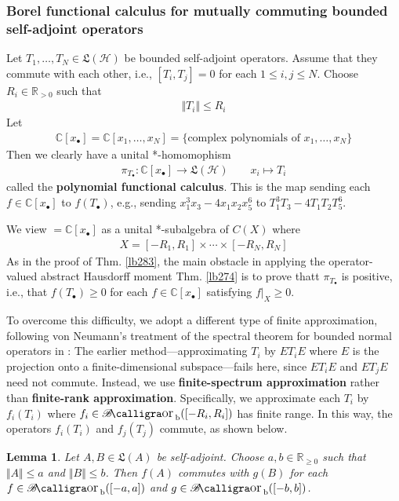 \documentclass[12pt,b5paper,notitlepage]{article}
\theoremstyle{definition}
\theoremstyle{plain}
\newtheorem{lm}[df]{Lemma}
\DeclareMathOperator{\Borb}{{\mathscr{B}\text{\kern -2pt {\calligra\large or}}\,}_{\mathrm b}}
\newcommand{\fk}{\mathfrak}
\newcommand{\blt}{\bullet}
\newcommand{\Cbb}{\mathbb C}
\newcommand{\Rbb}{\mathbb R}
\newcommand{\MH}{\mathcal H}
\numberwithin{equation}{section}
\begin{document}
\subsubsection{Borel functional calculus for mutually commuting bounded self-adjoint operators}


Let $T_1,\dots,T_N\in\fk L(\MH)$ be bounded self-adjoint operators. Assume that they commute with each other, i.e., $[T_i,T_j]=0$ for each $1\leq i,j\leq N$. Choose $R_i\in\Rbb_{>0}$ such that
\begin{align*}
\Vert T_i\Vert\leq R_i
\end{align*}
Let
\begin{align*}
\Cbb[x_\blt]=\Cbb[x_1,\dots,x_N]=\{\text{complex polynomials of }x_1,\dots,x_N\}
\end{align*}
Then we clearly have a unital *-homomophism
\begin{align*}
\pi_{T_\blt}:\Cbb[x_\blt]\rightarrow\fk L(\MH)\qquad x_i\mapsto T_i
\end{align*}
called the \textbf{polynomial functional calculus}.  This is the map sending each $f\in\Cbb[x_\blt]$ to $f(T_\blt)$, e.g., sending $x_1^3x_3-4x_1x_2x_5^6$ to $T_1^3T_3-4T_1T_2T_5^6$.

We view $=\Cbb[x_\blt]$ as a unital *-subalgebra of $C(X)$ where
\begin{align*}
X=[-R_1,R_1]\times\cdots\times[-R_N,R_N]
\end{align*}
As in the proof of Thm. \ref{lb283}, the main obstacle in applying the operator-valued abstract Hausdorff moment Thm. \ref{lb274} is to prove thatt $\pi_{T_\blt}$ is positive, i.e., that $f(T_\blt)\geq0$ for each $f\in\Cbb[x_\blt]$ satisfying $f|_X\geq0$. 


To overcome this difficulty, we adopt a different type of finite approximation, following von Neumann’s treatment of the spectral theorem for bounded normal operators in \cite[Anhang 2]{vN29a}: The earlier method---approximating $T_i$ by $ET_iE$ where $E$ is the projection onto a finite-dimensional subspace---fails here, since $ET_iE$ and $ET_jE$ need not commute. Instead, we use \textbf{finite-spectrum approximation} rather than \textbf{finite-rank approximation}. Specifically, we approximate each $T_i$ by $f_i(T_i)$ where $f_i\in\Borb([-R_i,R_i])$ has finite range. In this way, the operators $f_i(T_i)$ and $f_j(T_j)$ commute, as shown below.


\begin{lm}\label{lb295}
Let $A,B\in\fk L(A)$ be self-adjoint. Choose $a,b\in\Rbb_{\geq0}$ such that $\Vert A\Vert\leq a$ and $\Vert B\Vert\leq b$. Then $f(A)$ commutes with $g(B)$ for each $f\in\Borb([-a,a])$ and $g\in\Borb([-b,b])$.
\end{lm}
\end{document}

